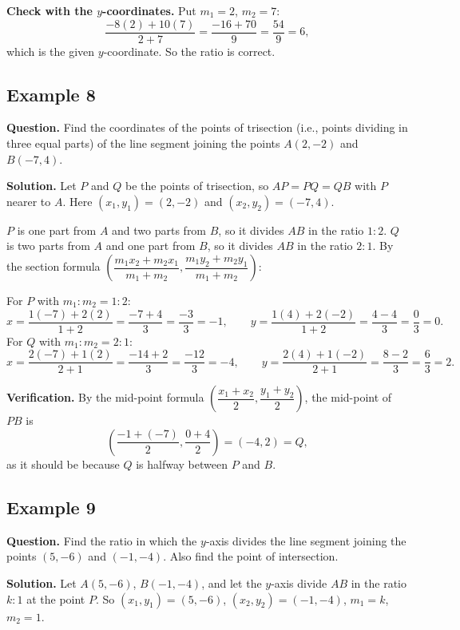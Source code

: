 \textbf{Check with the $y$-coordinates.} Put $m_1=2$, $m_2=7$:
\[\frac{-8(2)+10(7)}{2+7}=\frac{-16+70}{9}=\frac{54}{9}=6,\]
which is the given $y$-coordinate. So the ratio is correct.


\subsection*{Example 8}
\textbf{Question.} Find the coordinates of the points of trisection (i.e., points dividing in three equal parts) of the line segment joining the points $A(2,-2)$ and $B(-7,4)$.

\textbf{Solution.} Let $P$ and $Q$ be the points of trisection, so $AP=PQ=QB$ with $P$ nearer to $A$. Here $(x_1,y_1)=(2,-2)$ and $(x_2,y_2)=(-7,4)$.

$P$ is one part from $A$ and two parts from $B$, so it divides $AB$ in the ratio $1:2$. $Q$ is two parts from $A$ and one part from $B$, so it divides $AB$ in the ratio $2:1$.
By the section formula $\left(\dfrac{m_1x_2+m_2x_1}{m_1+m_2},\dfrac{m_1y_2+m_2y_1}{m_1+m_2}\right)$:

For $P$ with $m_1:m_2=1:2$:
\[
x=\frac{1(-7)+2(2)}{1+2}=\frac{-7+4}{3}=\frac{-3}{3}=-1,\qquad y=\frac{1(4)+2(-2)}{1+2}=\frac{4-4}{3}=\frac{0}{3}=0 .
\]
For $Q$ with $m_1:m_2=2:1$:
\[
x=\frac{2(-7)+1(2)}{2+1}=\frac{-14+2}{3}=\frac{-12}{3}=-4,\qquad y=\frac{2(4)+1(-2)}{2+1}=\frac{8-2}{3}=\frac{6}{3}=2 .
\]

\textbf{Verification.} By the mid-point formula $\left(\dfrac{x_1+x_2}{2},\dfrac{y_1+y_2}{2}\right)$, the mid-point of $PB$ is
\[
\left(\dfrac{-1+(-7)}{2},\dfrac{0+4}{2}\right)=(-4,2)=Q,
\]
as it should be because $Q$ is halfway between $P$ and $B$.


\subsection*{Example 9}
\textbf{Question.} Find the ratio in which the $y$-axis divides the line segment joining the points $(5,-6)$ and $(-1,-4)$. Also find the point of intersection.

\textbf{Solution.} Let $A(5,-6)$, $B(-1,-4)$, and let the $y$-axis divide $AB$ in the ratio $k:1$ at the point $P$. So $(x_1,y_1)=(5,-6)$, $(x_2,y_2)=(-1,-4)$, $m_1=k$, $m_2=1$.

